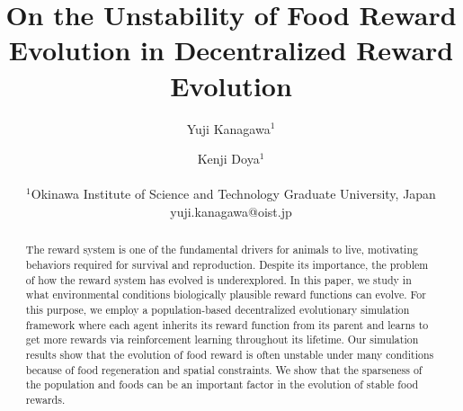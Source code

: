 \documentclass[letterpaper]{article}
\title{On the Unstability of Food Reward Evolution in Decentralized Reward Evolution}
\author{
  Yuji Kanagawa$^{1}$ \and
  Kenji Doya$^{1}$ \\
  \mbox{}\\
  $^1$Okinawa Institute of Science and Technology Graduate University, Japan
  yuji.kanagawa@oist.jp
} %
\newcommand{\1}{\mathbb{I} } %
\newcounter{num}
\begin{document}
\maketitle

\begin{abstract}
  The reward system is one of the fundamental drivers for animals to live, motivating behaviors required for survival and reproduction. Despite its importance, the problem of how the reward system has evolved is underexplored. In this paper, we study in what environmental conditions biologically plausible reward functions can evolve. For this purpose, we employ a population-based decentralized evolutionary simulation framework where each agent inherits its reward function from its parent and learns to get more rewards via reinforcement learning throughout its lifetime. Our simulation results show that the evolution of food reward is often unstable under many conditions because of food regeneration and spatial constraints. We show that the sparseness of the population and foods can be an important factor in the evolution of stable food rewards.
\end{abstract}







\appendix

\end{document}
